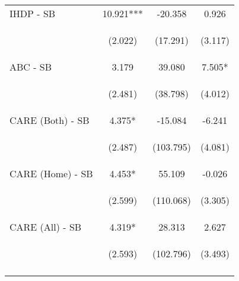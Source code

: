 \begin{tabular}{lccc}
\noalign{\smallskip}IHDP - SB & 10.921*** & -20.358 & 0.926\\
 & \begin{footnotesize}(2.022)\end{footnotesize} & \begin{footnotesize}(17.291)\end{footnotesize} & \begin{footnotesize}(3.117)\end{footnotesize}\\
\noalign{\smallskip}ABC - SB & 3.179 & 39.080 & 7.505*\\
 & \begin{footnotesize}(2.481)\end{footnotesize} & \begin{footnotesize}(38.798)\end{footnotesize} & \begin{footnotesize}(4.012)\end{footnotesize}\\
\noalign{\smallskip}CARE (Both) - SB & 4.375* & -15.084 & -6.241\\
 & \begin{footnotesize}(2.487)\end{footnotesize} & \begin{footnotesize}(103.795)\end{footnotesize} & \begin{footnotesize}(4.081)\end{footnotesize}\\
\noalign{\smallskip}CARE (Home) - SB & 4.453* & 55.109 & -0.026\\
 & \begin{footnotesize}(2.599)\end{footnotesize} & \begin{footnotesize}(110.068)\end{footnotesize} & \begin{footnotesize}(3.305)\end{footnotesize}\\
\noalign{\smallskip}CARE (All) - SB & 4.319* & 28.313 & 2.627\\
 & \begin{footnotesize}(2.593)\end{footnotesize} & \begin{footnotesize}(102.796)\end{footnotesize} & \begin{footnotesize}(3.493)\end{footnotesize}\\
\noalign{\smallskip}\hline\end{tabular}\\
